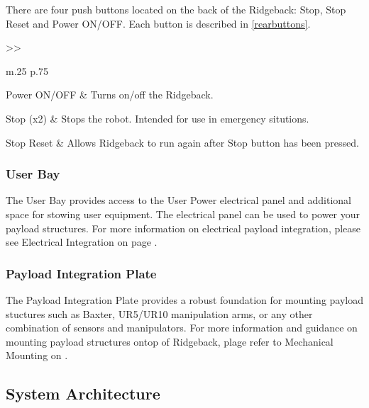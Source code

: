 \documentclass[]{clearpath-latex/clearpath-manual}
\begin{document}
There are four push buttons located on the back of the Ridgeback: Stop, Stop Reset and Power ON/OFF.   Each button is described in \autoref{rearbuttons}. 

\bgroup
\def\arraystretch{1.2}%
\begin{table}[h]
	\centering
	\begin{tabular}{>{}>{\raggedright}m{.25\textwidth} p{.75\textwidth}} \hline 

	Power ON/OFF & Turns on/off the Ridgeback. \\ \hline

	Stop (x2) & Stops the robot.  Intended for use in emergency situtions.  \\ \hline	
	
	Stop Reset & Allows Ridgeback to run again after Stop button has been pressed.  \\ \hline	
	
	\end{tabular}
\newline
\caption{Ridgeback Rear Buttons}
\label{rearbuttons}
\end{table}
\egroup


\subsubsection{User Bay}

The User Bay provides access to the User Power electrical panel and additional space for stowing user equipment.  The electrical panel can be used to power your payload structures.  For more information on electrical payload integration, please see Electrical Integration on page \pageref{electrical}.


\subsubsection{Payload Integration Plate}

The Payload Integration Plate provides a robust foundation for mounting payload stuctures such as Baxter, UR5/UR10 manipulation arms, or any other combination of sensors and manipulators.   For more information and guidance on mounting payload structures ontop of Ridgeback, plage refer to Mechanical Mounting on \pageref{mechanical}.



\subsection{System Architecture}
\end{document}
